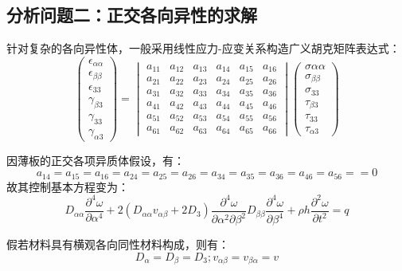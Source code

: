 \documentclass[withoutpreface,bwprint]{cumcmthesis} %
\begin{document}
 \subsection{分析问题二：正交各向异性的求解}
    针对复杂的各向异性体，一般采用线性应力-应变关系构造广义胡克矩阵表达式：
    \begin{equation}
        \begin{pmatrix}
\epsilon_{\alpha\alpha}\\
\epsilon_{\beta\beta}\\
\epsilon_{33}\\
\gamma_{\beta 3}\\
\gamma_{33}\\
\gamma_{\alpha 3}
\end{pmatrix}=
\begin{vmatrix}
a_{11}&a_{12}&a_{13}&a_{14}&a_{15}&a_{16}\\
a_{21}&a_{22}&a_{23}&a_{24}&a_{25}&a_{26}\\
a_{31}&a_{32}&a_{33}&a_{34}&a_{35}&a_{36}\\
a_{41}&a_{42}&a_{43}&a_{44}&a_{45}&a_{46}\\
a_{51}&a_{52}&a_{53}&a_{54}&a_{55}&a_{56}\\
a_{61}&a_{62}&a_{63}&a_{64}&a_{65}&a_{66}
\end{vmatrix} 
        \begin{pmatrix}
\sigma{\alpha\alpha}\\
\sigma_{\beta\beta}\\
\sigma_{33}\\
\tau_{\beta 3}\\
\tau_{33}\\
\tau_{\alpha 3}
\end{pmatrix}
    \end{equation}

    因薄板的正交各项异质体假设，有：
    \begin{equation}
        a_{14}=a_{15}=a_{16}=a_{24}=a_{25}=a_{26}=a_{34}=a_{35}=a_{36}=a_{46}=a_{56}==0
    \end{equation}
    故其控制基本方程变为：
    \begin{equation}
        D_{\alpha\alpha}\frac{\partial^4 \omega}{\partial \alpha^4}+2(D_{\alpha\alpha}v_{\alpha\beta}+2D_3)\frac{\partial^4\omega}{\partial \alpha^2 \partial \beta^2}D_{\beta\beta}\frac{\partial^4 \omega}{\partial \beta^4}+\rho h\frac{\partial^2 \omega}{\partial t^2}=q
    \end{equation}
    
假若材料具有横观各向同性材料构成，则有：
\begin{equation}
    D_\alpha=D_\beta=D_3;v_{\alpha\beta}=v_{\beta\alpha}=v
\end{equation}
\end{document}
